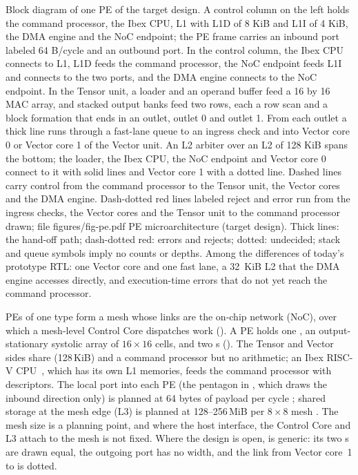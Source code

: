 %
  {Block diagram of one PE of the target design. A control column on the left holds the command processor, the Ibex CPU, L1 with L1D of 8 KiB and L1I of 4 KiB, the DMA engine and the NoC endpoint; the PE frame carries an inbound port labeled 64 B/cycle and an outbound port. In the control column, the Ibex CPU connects to L1, L1D feeds the command processor, the NoC endpoint feeds L1I and connects to the two ports, and the DMA engine connects to the NoC endpoint. In the Tensor unit, a loader and an operand buffer feed a 16 by 16 MAC array, and stacked output banks feed two rows, each a row scan and a block formation that ends in an outlet, outlet 0 and outlet 1. From each outlet a thick line runs through a fast-lane queue to an ingress check and into Vector core 0 or Vector core 1 of the Vector unit. An L2 arbiter over an L2 of 128 KiB spans the bottom; the loader, the Ibex CPU, the NoC endpoint and Vector core 0 connect to it with solid lines and Vector core 1 with a dotted line. Dashed lines carry control from the command processor to the Tensor unit, the Vector cores and the DMA engine. Dash-dotted red lines labeled reject and error run from the ingress checks, the Vector cores and the Tensor unit to the command processor}%
  {drawn; file figures/fig-pe.pdf}%
  {PE microarchitecture (target design). Thick lines: the hand-off path; dash-dotted red: errors and rejects; dotted: undecided; stack and queue symbols imply no counts or depths. Among the differences of today's prototype RTL: one Vector core and one fast lane, a 32~KiB L2 that the DMA engine accesses directly, and execution-time errors that do not yet reach the command processor.}

%
PEs of one type form a mesh whose links are the on-chip network (NoC), over which a mesh-level Control Core dispatches work ().
A PE holds one \TensorUnit, an output-stationary systolic array of $16\times16$ cells, and two \VectorCore{}s ().
The Tensor and Vector sides share \Lii (128\,KiB) and a command processor but no arithmetic; an Ibex RISC-V CPU~, which has its own L1 memories, feeds the command processor with descriptors.
The local port into each PE (the pentagon in , which draws the inbound direction only) is planned at 64 bytes of payload per cycle
;
shared storage at the mesh edge (L3) is planned at 128--256\,MiB per $8\times8$ mesh
.
The mesh size is a planning point, and where the host interface, the Control Core and L3 attach to the mesh is not fixed.
Where the design is open,  is generic: its two \VectorCore{}s are drawn equal, the outgoing port has no width, and the link from Vector core~1 to \Lii is dotted.

